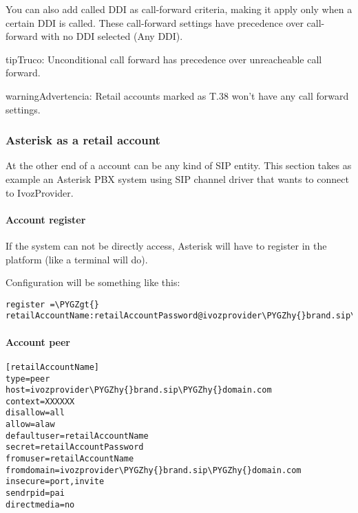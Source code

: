 \documentclass[letterpaper,10pt,spanish]{sphinxmanual}
\def\PYGZgt{\char`\>}
\def\PYGZhy{\char`\-}
\begin{document}
You can also add called DDI as call-forward criteria, making it apply only when a certain DDI is called. These call-forward
settings have precedence over call-forward with no DDI selected (Any DDI).

\begin{notice}{tip}{Truco:}
Unconditional call forward has precedence over unreacheable call forward.
\end{notice}

\begin{notice}{warning}{Advertencia:}
Retail accounts marked as T.38 won't have any call forward settings.
\end{notice}


\subsubsection{Asterisk as a retail account}
\label{administration_portal/client/retail/retail_accounts:asterisk-as-a-retail-account}
At the other end of a account can be any kind of SIP entity. This section takes
as example an Asterisk PBX system using SIP channel driver that wants to connect
to IvozProvider.


\paragraph{Account register}
\label{administration_portal/client/retail/retail_accounts:account-register}
If the system can not be directly access, Asterisk will have to register in the
platform (like a terminal will do).

Configuration will be something like this:

\begin{Verbatim}[commandchars=\\\{\}]
register =\PYGZgt{} retailAccountName:retailAccountPassword@ivozprovider\PYGZhy{}brand.sip\PYGZhy{}domain.com
\end{Verbatim}


\paragraph{Account peer}
\label{administration_portal/client/retail/retail_accounts:account-peer}
\begin{Verbatim}[commandchars=\\\{\}]
[retailAccountName]
type=peer
host=ivozprovider\PYGZhy{}brand.sip\PYGZhy{}domain.com
context=XXXXXX
disallow=all
allow=alaw
defaultuser=retailAccountName
secret=retailAccountPassword
fromuser=retailAccountName
fromdomain=ivozprovider\PYGZhy{}brand.sip\PYGZhy{}domain.com
insecure=port,invite
sendrpid=pai
directmedia=no
\end{Verbatim}
\end{document}
